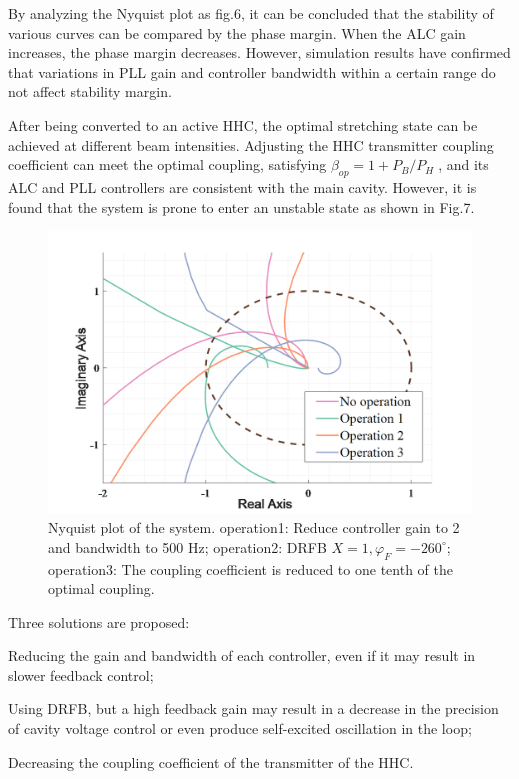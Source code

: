 \documentclass[letterpaper,
               nospread,     %
               ]{jacow}
\begin{document}
By analyzing the Nyquist plot as fig.6, it can be concluded that the stability of various curves can be compared by the phase margin. When the ALC gain increases, the phase margin decreases. However, simulation results have confirmed that variations in PLL gain and controller bandwidth within a certain range do not affect stability margin.

After being converted to an active HHC, the optimal stretching state can be achieved at different beam intensities. Adjusting the HHC transmitter coupling coefficient can meet the optimal coupling, satisfying ${{\beta }_{op}}=1+{{{P}_{B}}}/{{{P}_{H}}}\;$\cite{ref15}, and its ALC and PLL controllers are consistent with the main cavity. However, it is found that the system is prone to enter an unstable state as shown in Fig.7.
\begin{figure}[!htb]
   \centering
   \includegraphics*[width=0.7\columnwidth]{THPA037_f7}
   \caption{Nyquist plot of the system. operation1: Reduce controller gain to 2 and bandwidth to 500 Hz; operation2: DRFB $X=1,{\varphi _F}=-260^\circ $; operation3: The coupling coefficient is reduced to one tenth of the optimal coupling.}
   \label{fig:paper_layout}
\end{figure}

Three solutions are proposed:
\begin{Itemize}
   \item  Reducing the gain and bandwidth of each controller, even if it may result in slower feedback control;
   \item  Using DRFB, but a high feedback gain may result in a decrease in the precision of cavity voltage control or even produce self-excited oscillation in the loop;
   \item  Decreasing the coupling coefficient of the transmitter of the HHC.
\end{Itemize}
\end{document}
